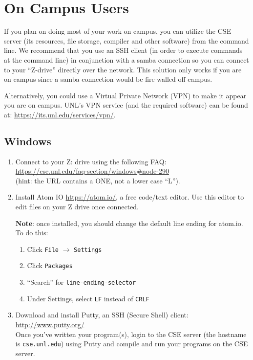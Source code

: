 \documentclass[12pt]{scrartcl}
\begin{document}
\section{On Campus Users}

If you plan on doing most of your work on campus, you can utilize
the CSE server (its resources, file storage, compiler and other
software) from the command line.  We recommend that you use an 
SSH client (in order to execute commands at the command line) in 
conjunction with a samba connection so you can connect to your
``Z-drive'' directly over the network.  This solution only works 
if you are on campus since a samba connection would be fire-walled
off campus.  

Alternatively, you could use a Virtual Private Network (VPN) to make 
it appear you are on campus.  UNL's VPN service (and the
required software) can be found at: \url{https://its.unl.edu/services/vpn/}.

\subsection{Windows}

\begin{enumerate} 
  \item Connect to your Z: drive using the following FAQ: \\
  \url{https://cse.unl.edu/faq-section/windows#node-290}\\
  (hint: the URL contains a ONE, not a lower case ``L'').
  \item Install Atom IO \url{https://atom.io/}, a free code/text 
  editor.  Use this editor to edit files on your Z drive once connected.
  
  \textbf{Note}: once installed, you should change the default line ending
  for atom.io.  To do this:
  \begin{enumerate}
    \item Click \texttt{File} $\rightarrow$ \texttt{Settings}
    \item Click \texttt{Packages}
    \item ``Search'' for \texttt{line-ending-selector}
    \item Under Settings, select \texttt{LF} instead of \texttt{CRLF}
  \end{enumerate}
  
  \item Download and install Putty, an SSH (Secure Shell) client: \\
  \url{http://www.putty.org/}\\
  Once you've written your program(s), login to the CSE server
  (the hostname is \texttt{cse.unl.edu})
  using Putty and compile and run your programs on the CSE server.  
\end{enumerate}
\end{document}
